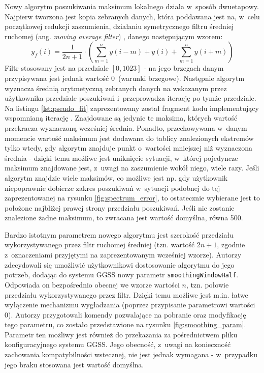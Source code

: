 Nowy algorytm poszukiwania maksimum lokalnego działa w~sposób dwuetapowy. Najpierw tworzona jest kopia zebranych danych, która poddawana jest na, w~celu początkowej redukcji zaszumienia, działaniu symetrycznego filtru średniej ruchomej (ang. \emph{moving average filter}) \cite{smoothing}, danego następującym wzorem:
\begin{equation}
y_f(i) = \frac{1}{2n + 1} \cdot \left(\sum_{m=1}^{n} y(i - m) + y(i) + \sum_{m=1}^{n} y(i + m) \right)
\end{equation}
Filtr stosowany jest na przedziale $[0, 1023]$ - na jego brzegach danym przypisywana jest jednak wartość 0~(warunki brzegowe). Następnie algorytm wyznacza średnią arytmetyczną zebranych danych na wskazanym przez użytkownika przedziale poszukiwań i~przeprowadza iterację po tymże przedziale. Na listingu \ref{lst:pseudo_fit} zaprezentowany został fragment kodu implementujący wspomnianą iterację \cite{baeldung_fit}. Znajdowane są jedynie te maksima, których wartość przekracza wyznaczoną wcześniej średnia. Ponadto, przechowywana w~danym momencie wartość maksimum jest dodawana do tablicy znalezionych ekstremów tylko wtedy, gdy algorytm znajduje punkt o~wartości mniejszej niż wyznaczona średnia - dzięki temu możliwe jest uniknięcie sytuacji, w~której pojedyncze maksimum znajdowane jest, z~uwagi na zaszumienie wokół niego, wiele razy. Jeśli algorytm znajdzie wiele maksimów, co możliwe jest np. gdy użytkownik niepoprawnie dobierze zakres poszukiwań w~sytuacji podobnej do tej zaprezentowanej na rysunku \ref{fig:spectrum_error}, to ostatecznie wybierane jest to położone najbliżej prawej strony przedziału poszukiwań. Jeśli nie zostanie znalezione żadne maksimum, to zwracana jest wartość domyślna, równa 500. 



Bardzo istotnym parametrem nowego algorytmu jest szerokość przedziału wykorzystywanego przez filtr ruchomej średniej (tzn. wartość $2n + 1$, zgodnie z~oznaczeniami przyjętymi na zaprezentowanym wcześniej wzorze). Autorzy zdecydowali się umożliwić użytkownikowi dostosowanie algorytmu do jego potrzeb, dodając do systemu GGSS nowy parametr \lstinline{smoothingWindowHalf}. Odpowiada on bezpośrednio obecnej we wzorze wartości $n$, tzn. połowie przedziału wykorzystywanego przez filtr. Dzięki temu możliwe jest m.in. łatwe wyłączenie mechanizmu wygładzania (poprzez przypisanie parametrowi wartości 0). Autorzy przygotowali komendy pozwalające na pobranie oraz modyfikację tego parametru, co zostało przedstawione na rysunku \ref{fig:smoothing_param}. Parametr ten możliwy jest również do przekazania za pośrednictwem pliku konfiguracyjnego systemu GGSS. Jego obecność, z~uwagi na konieczność zachowania kompatybilności wstecznej, nie jest jednak wymagana - w~przypadku jego braku stosowana jest wartość domyślna.

